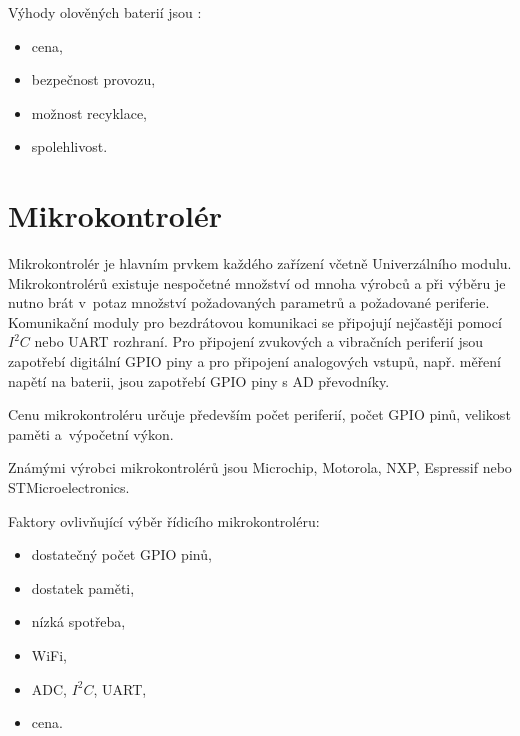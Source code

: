 Výhody olověných baterií jsou \cite{olovene}:
\begin{itemize}
  \item cena,
  \item bezpečnost provozu,
  \item možnost recyklace,
  \item spolehlivost. 
\end{itemize}
 
\section{Mikrokontrolér}
Mikrokontrolér je hlavním prvkem každého zařízení včetně Univerzálního modulu. Mikrokontrolérů existuje nespočetné množství od mnoha výrobců a při výběru je nutno brát v~potaz
množství požadovaných parametrů a požadované periferie. 
Komunikační moduly pro bezdrátovou komunikaci se připojují nejčastěji pomocí $I^2C$ nebo UART rozhraní. Pro připojení zvukových a vibračních periferií jsou zapotřebí 
digitální GPIO piny a pro připojení analogových vstupů, např. měření napětí na baterii, jsou zapotřebí GPIO piny s AD převodníky. 

Cenu mikrokontroléru určuje především počet periferií, počet GPIO pinů, velikost paměti a~výpočetní výkon.

Známými výrobci mikrokontrolérů jsou Microchip, Motorola, NXP, Espressif nebo \\STMicroelectronics. 

Faktory ovlivňující výběr řídicího mikrokontroléru:
\begin{itemize}
  \item dostatečný počet GPIO pinů,
  \item dostatek paměti,
  \item nízká spotřeba,
  \item WiFi,
  \item ADC, $I^2C$, UART,
  \item cena.
\end{itemize}







